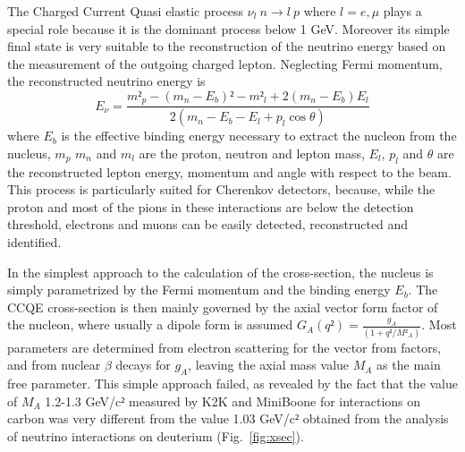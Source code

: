 The Charged Current Quasi elastic process $\nu_l \: n \rightarrow l \: p$ where $l=e,\mu$ plays a special role because it is the dominant process below 1 GeV. Moreover its simple final state is very suitable to the reconstruction of the neutrino energy based on the measurement of the outgoing charged lepton. Neglecting Fermi momentum, the reconstructed neutrino energy is 
\begin{equation}
E_\nu = \frac{m²_p - (m_n-E_b)² - m²_l + 2 (m_n-E_b)E_l}{2 (m_n - E_b - E_l + p_l \cos \theta)}
\end{equation}
 where $E_b$ is the effective binding energy necessary to extract the nucleon from the nucleus, $m_p$ $m_n$ and $m_l$  are the proton, neutron and lepton mass, $E_l$, $p_l$ and $\theta$ are the reconstructed lepton energy, momentum and angle with respect to the beam. This process is particularly suited for Cherenkov detectors, because, while the proton and most of the pions in these interactions are below the detection threshold, electrons and muons can be easily detected, reconstructed and identified. 

In the simplest approach to the calculation of the cross-section, the nucleus is simply parametrized by the Fermi momentum and the binding energy $E_b$. The CCQE cross-section is then mainly governed by the axial vector form factor of the nucleon, where usually a dipole form is assumed
$ G_A (q²) = \frac {g_A} {(1+q²/M²_A)}$.
Most parameters are determined from electron scattering for the vector from factors, and from nuclear $\beta$ decays for $g_A$, leaving the axial mass value $M_A$ as the main free parameter. This simple approach failed, as revealed by the fact that the value of $M_A$ 1.2-1.3 GeV/c$²$ measured by K2K and  MiniBoone for interactions on carbon was very different from the value 1.03 GeV/c$²$ obtained from the analysis of neutrino interactions on deuterium (Fig.~\ref{fig:xsec}).

